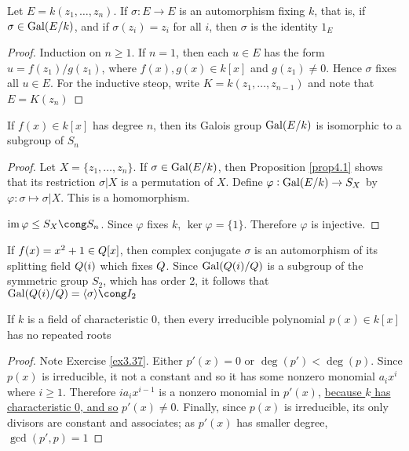 \documentclass[11pt]{article}
\begin{document}
\begin{lemma}[]
\label{lemma4.2}
Let \(E=k(z_1,\dots,z_n)\). If \(\sigma:E\to E\) is an automorphism fixing \(k\),
that is, if \(\sigma\in\operatorname{Gal}(E/k)\), and if \(\sigma(z_i)=z_i\) for all \(i\), then
\(\sigma\) is the identity \(1_E\)
\end{lemma}

\begin{proof}
Induction on \(n\ge1\). If \(n=1\), then each \(u\in E\) has the form 
\(u=f(z_1)/g(z_1)\), where \(f(x),g(x)\in k[x]\) and \(g(z_1)\neq0\). Hence
\(\sigma\) fixes all \(u\in E\). For the inductive steop, write
\(K=k(z_1,\dots,z_{n-1})\) and note that \(E=K(z_n)\)
\end{proof}

\begin{theorem}[]
If \(f(x)\in k[x]\) has degree \(n\), then its Galois group \(\operatorname{Gal}(E/k)\) is
isomorphic to a subgroup of \(S_n\)
\end{theorem}

\begin{proof}
Let \(X=\{z_1,\dots,z_n\}\). If \(\sigma\in\operatorname{Gal}(E/k)\), then Proposition
\ref{prop4.1} shows that its restriction \(\sigma|X\) is a permutation of \(X\).
Define \(\varphi:\operatorname{Gal}(E/k)\to S_X\) by \(\varphi:\sigma\mapsto\sigma|X\). This is a
homomorphism.

\(\im\varphi\le S_X\cong S_n\). Since \(\varphi\) fixes \(k\), \(\ker\varphi=\{1\}\).
Therefore \(\varphi\) is injective.
\end{proof}

If \(f(x)=x^2+1\in\relax{Q}[x]\), then complex conjugate \(\sigma\) is an automorphism of its
splitting field \(\relax{Q}(i)\) which fixes \(\relax{Q}\). Since \(\operatorname{Gal}(\relax{Q}(i)/\relax{Q})\) is a
subgroup of the symmetric group \(S_2\), which has order 2, it follows that 
\(\Gal(\Q(i)/\Q)=\la\sigma\ra\cong\I_2\)

\begin{lemma}[]
\label{lemma4.4}
If \(k\) is a field of characteristic 0, then every irreducible polynomial 
\(p(x)\in k[x]\) has no repeated roots
\end{lemma}

\begin{proof}
Note Exercise \ref{ex3.37}. Either \(p'(x)=0\) or \(\deg(p')<\deg(p)\).
Since \(p(x)\) is irreducible, it not a constant and so it has some nonzero
monomial \(a_ix^i\) where \(i\ge1\). Therefore \(ia_ix^{i-1}\) is a nonzero
monomial in \(p'(x)\), \uline{because \(k\) has characteristic 0, and so} 
\uline{\(p'(x)\neq 0\)}. Finally, since \(p(x)\) is irreducible, its only divisors
are constant and associates; as \(p'(x)\) has smaller degree, \(\gcd(p',p)=1\)
\end{proof}
\end{document}
